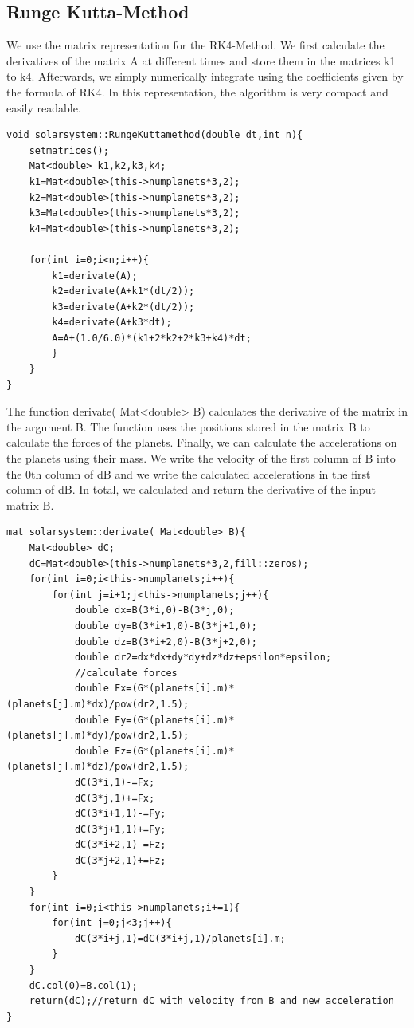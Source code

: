 \documentclass[10pt,a4paper]{article}
\begin{document}
\subsection{Runge Kutta-Method}
We use the matrix representation for the RK4-Method. We first calculate the derivatives of the matrix A at different times and store them in the matrices k1 to k4. Afterwards, we simply numerically integrate using the coefficients given by the formula of RK4. In this representation, the algorithm is very compact and easily readable.  
\begin{lstlisting}
void solarsystem::RungeKuttamethod(double dt,int n){
    setmatrices();
    Mat<double> k1,k2,k3,k4;
    k1=Mat<double>(this->numplanets*3,2);
    k2=Mat<double>(this->numplanets*3,2);
    k3=Mat<double>(this->numplanets*3,2);
    k4=Mat<double>(this->numplanets*3,2);

    for(int i=0;i<n;i++){
        k1=derivate(A);
        k2=derivate(A+k1*(dt/2));
        k3=derivate(A+k2*(dt/2));
        k4=derivate(A+k3*dt);
        A=A+(1.0/6.0)*(k1+2*k2+2*k3+k4)*dt;
        }
    }
}
\end{lstlisting}
The function derivate( Mat<double> B) calculates the derivative of the matrix in the argument B. The function uses the positions stored in the matrix B to calculate the forces of the planets. Finally, we can calculate the accelerations on the planets using their mass. We write the velocity of the first column of B into the 0th column of dB and we write the calculated accelerations in the first column of dB. 
In total, we calculated and return the derivative of the input matrix B.
\begin{lstlisting}
mat solarsystem::derivate( Mat<double> B){
    Mat<double> dC;
    dC=Mat<double>(this->numplanets*3,2,fill::zeros);
    for(int i=0;i<this->numplanets;i++){
        for(int j=i+1;j<this->numplanets;j++){
            double dx=B(3*i,0)-B(3*j,0);
            double dy=B(3*i+1,0)-B(3*j+1,0);
            double dz=B(3*i+2,0)-B(3*j+2,0);
            double dr2=dx*dx+dy*dy+dz*dz+epsilon*epsilon;
            //calculate forces
            double Fx=(G*(planets[i].m)*(planets[j].m)*dx)/pow(dr2,1.5);
            double Fy=(G*(planets[i].m)*(planets[j].m)*dy)/pow(dr2,1.5);
            double Fz=(G*(planets[i].m)*(planets[j].m)*dz)/pow(dr2,1.5);
            dC(3*i,1)-=Fx;
            dC(3*j,1)+=Fx;
            dC(3*i+1,1)-=Fy;
            dC(3*j+1,1)+=Fy;
            dC(3*i+2,1)-=Fz;
            dC(3*j+2,1)+=Fz;
        }
    }
    for(int i=0;i<this->numplanets;i+=1){
        for(int j=0;j<3;j++){
            dC(3*i+j,1)=dC(3*i+j,1)/planets[i].m;
        }
    }
    dC.col(0)=B.col(1);
    return(dC);//return dC with velocity from B and new acceleration
}
\end{lstlisting}
\clearpage
\end{document}
